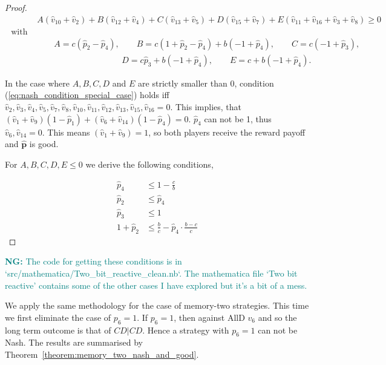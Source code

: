 \documentclass{article}
\theoremstyle{definition}
\newcommand{\nikoleta}[1]{\textcolor{teal}{{\bf NG:} #1}}
\begin{document}
\begin{proof}
  \begin{align}
    & A (\hat{v}_{10} + \hat{v}_{2}) + B (\hat{v}_{12} + \hat{v}_4) 
    + C (\hat{v}_{13} + \hat{v}_5) + D (\hat{v}_{15} + \hat{v}_7) + E (\hat{v}_{11} + \hat{v}_{16} + \hat{v}_3 + \hat{v}_8) \geq  0 \label{eq:nash_condition_special_case} \\ \text{ with } \nonumber \\ 
    & \qquad A = c (\hat{p}_2 - \hat{p}_4), \qquad B = c (1 + \hat{p}_2 - \hat{p}_4) + b (-1 + \hat{p}_4), \qquad C = c (-1 + \hat{p}_3),  \nonumber \\
    & \qquad  \qquad  \qquad \qquad \qquad D = c \hat{p}_3 + b (-1 + \hat{p}_4), \qquad E = c + 
    b (-1 + \hat{p}_4). \nonumber
  \end{align}
  
  In the case where \(A, B, C, D\) and \(E\) are strictly smaller than 0, condition
  (\ref{eq:nash_condition_special_case}) holds iff \(\hat{v}_2, \hat{v}_3,
  \hat{v}_4, \hat{v}_5, \hat{v}_7, \hat{v}_8, \hat{v}_{10},
  \hat{v}_{11}, \allowbreak \hat{v}_{12}, \hat{v}_{13}, \hat{v}_{15}, \hat{v}_{16} =
  0\). This implies, that \((\hat{v}_1 + \hat{v}_9) (1 - \hat{p}_1) + (\hat{v}_6 +
  \hat{v}_{14}) (1 - \hat{p}_4) = 0\). \(\hat{p}_4\) can not be 1, thus \(\hat{v}_6,
  \hat{v}_{14} = 0\). This means \((\hat{v}_1 + \hat{v}_9) = 1\), so both
  players receive the reward payoff and \(\mathbf{\hat{p}}\) is good.
  
  For \(A, B, C, D, E \leq 0\) we derive the following conditions,
  
  \begin{align}\label{eq:nash_conditions}
    \hat{p}_4       & \leq 1 - \frac{c}{b} \\
    \hat{p}_2       & \leq \hat{p}_4 \\
    \hat{p}_3       & \leq 1 \\
    1 + \hat{p}_2 & \leq \frac{b}{c} - \hat{p}_4 \cdot \frac{b\!-\!c}{c}
  \end{align}
  
  \end{proof}
  
\nikoleta{The code for getting these conditions is in `src/mathematica/Two\_bit\_reactive\_clean.nb`.
The mathematica file `Two bit reactive' contains some of the other cases I have
explored but it's a bit of a mess.}

We apply the same methodology for the case of memory-two strategies. This time
we first eliminate the case of \(p_6 = 1\). If \(p_6 = 1\), then against AllD
\(v_6\) and so the long term outcome is that of \(CD|CD\).
Hence a strategy with \(p_6 = 1\) can not be
Nash. The results
are summarised by Theorem~\ref{theorem:memory_two_nash_and_good}.
  
\end{document}

